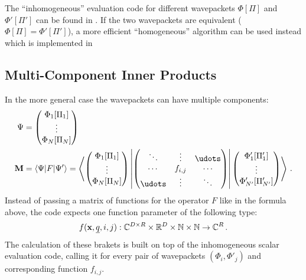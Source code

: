 The ``inhomogeneous'' evaluation code for different wavepackets $\Phi[\Pi]$
and $\Phi'[\Pi']$ can be found in
.
If the two wavepackets are equivalent ($\Phi[\Pi] = \Phi'[\Pi']$), a more efficient
``homogeneous'' algorithm can be used instead which is implemented in


\subsection{Multi-Component Inner Products}

In the more general case the wavepackets can have multiple components:
\begin{align}
  \Psi &= \begin{pmatrix} \Phi_1[\Pi_1] \\ \vdots \\ \Phi_N[\Pi_N] \end{pmatrix} \\
  \mat{M} &= \langle \Psi | F | \Psi' \rangle = \left\langle
    \begin{pmatrix} \Phi_1[\Pi_1] \\ \vdots \\ \Phi_N[\Pi_N] \end{pmatrix} \left|
    \begin{pmatrix} \ddots & \vdots & \udots \\ \cdots & f_{i,j} & \cdots \\
      \udots & \vdots & \ddots \end{pmatrix} \right|
    \begin{pmatrix} \Phi'_1[\Pi_1'] \\ \vdots \\ \Phi'_{N'}[\Pi_{N'}'] \end{pmatrix}
    \right\rangle \,.
\end{align}
Instead of passing a matrix of functions for the operator $F$ like in the
formula above, the code expects one function parameter of the following type:
\begin{equation}
  f(\mathbf{x}, \underline{q}, i, j) : \mathbb{C}^{D \times R} \times \mathbb{R}^D
  \times \mathbb{N} \times \mathbb{N} \rightarrow \mathbb{C}^R \,.
\end{equation}
The calculation of these brakets is built on top of the inhomogeneous scalar
evaluation code, calling it for every pair of wavepackets $(\Phi_i,\Phi'_j)$ and
corresponding function $f_{i,j}$.

